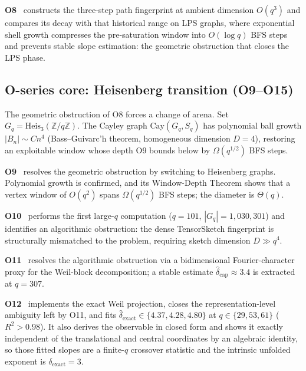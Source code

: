 \documentclass[11pt,a4paper]{article}
\theoremstyle{definition}
\newcommand{\Heis}{\mathrm{Heis}}
\newcommand{\Cay}{\mathrm{Cay}}
\begin{document}
      \textbf{O8}~\cite{Beau2026a12} constructs the three-step path fingerprint at ambient
      dimension $O(q^3)$ and compares its decay with that historical range on LPS graphs, where exponential shell growth
      compresses the pre-saturation window into $O(\log q)$ BFS steps and prevents stable slope
      estimation: the geometric obstruction that closes the LPS phase.

    \subsection{O-series core: Heisenberg transition (O9--O15)}
      \label{sec:heisenberg}

      The geometric obstruction of O8 forces a change of arena.
      Set $G_q = \Heis_3(\mathbb{Z}/q\mathbb{Z})$.
      The Cayley graph $\Cay(G_q, S_q)$ has polynomial ball growth
      $|B_n| \sim C n^4$ (Bass--Guivarc'h theorem, homogeneous dimension $D = 4$), restoring an
      exploitable window whose depth O9 bounds below by $\Omega(q^{1/2})$ BFS steps.

      \textbf{O9}~\cite{Beau2026a13} resolves the geometric obstruction by switching to
      Heisenberg graphs.
      Polynomial growth is confirmed, and its Window-Depth Theorem shows that a vertex window of
      $O(q^2)$ spans $\Omega(q^{1/2})$ BFS steps; the diameter is $\Theta(q)$.

      \textbf{O10}~\cite{Beau2026a14} performs the first large-$q$ computation ($q = 101$,
      $|G_q| = 1{,}030{,}301$) and identifies an algorithmic obstruction: the dense TensorSketch
      fingerprint is structurally mismatched to the problem, requiring sketch dimension
      $D \gg q^4$.

      \textbf{O11}~\cite{Beau2026a15} resolves the algorithmic obstruction via a bidimensional
      Fourier-character proxy for the Weil-block decomposition; a stable estimate
      $\hat\delta_{\mathrm{cap}} \approx 3.4$ is extracted at $q = 307$.

      \textbf{O12}~\cite{Beau2026a16} implements the exact Weil projection, closes the
      representation-level ambiguity left by O11, and fits
      $\hat\delta_{\mathrm{exact}} \in \{4.37, 4.28, 4.80\}$ at $q \in \{29, 53, 61\}$
      ($R^2 > 0.98$).
      It also derives the observable in closed form and shows it exactly independent of the
      translational and central coordinates by an algebraic identity, so those fitted slopes are a
      finite-$q$ crossover statistic and the intrinsic unfolded exponent is
      $\delta_{\mathrm{exact}} = 3$.
\end{document}
